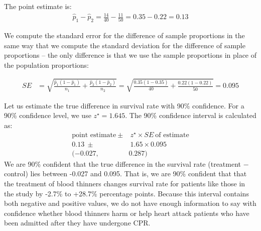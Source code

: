 The point estimate is:
  \begin{align*}
  \hat{p}_{1} - \hat{p}_{2}
    = \frac{14}{40} - \frac{11}{50}
    = 0.35 - 0.22
    = 0.13
  \end{align*}

We compute the standard error for the difference of sample proportions in the same way that we compute the standard deviation for the difference of sample proportions --  the only difference is that we use the sample proportions in place of the population proportions:

\begin{align*}
SE &= \sqrt{\frac{\hat{p}_1(1-\hat{p}_1)}{n_1} + \frac{\hat{p}_2(1-\hat{p}_2)}{n_2}}= \sqrt{\frac{0.35 (1 - 0.35)}{40} +
      \frac{0.22 (1 - 0.22)}{50}}
    = 0.095
  \end{align*}

Let us estimate the true difference in survival rate with 90\% confidence.  For a 90\% confidence level, we use $z^{\star} = 1.645$.  The 90\% confidence interval is calculated as:
  \begin{align*}
  \text{point estimate} \ \pm&\ z^{\star} \times SE\ \text{of estimate}\\
     0.13 \ \pm&\ 1.65\times 0.095\\
 (-0.027,\ & 0.287)
  \end{align*}
We are 90\% confident that the true difference in the survival rate (treatment $-$ control) lies between -0.027 and 0.095.  That is, we are 90\% confident that that the treatment of blood thinners changes survival rate for patients like those in the study by -2.7\% to +28.7\% percentage points.  Because this interval contains both negative and positive values, we do not have enough information to say
  with confidence whether blood thinners harm or help
  heart attack patients who have been admitted after
  they have undergone CPR.







